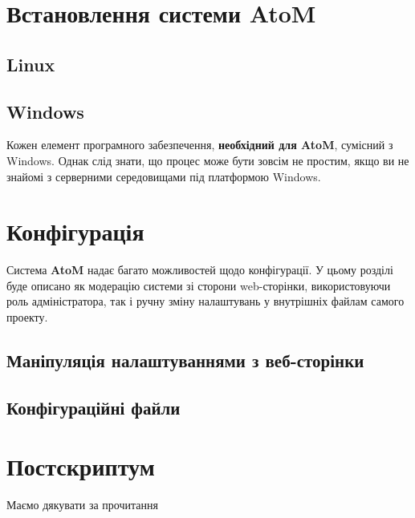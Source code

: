 \documentclass[14pt,a4paper]{article}
\begin{document}
\section{Встановлення системи AtoM}
\begin{large}

\subsection{Linux}



\subsection{Windows}
Кожен елемент програмного забезпечення, \textbf{необхідний для AtoM}, сумісний з Windows. Однак слід знати, що процес може бути зовсім не простим, якщо ви не знайомі з серверними середовищами під платформою Windows.
\end{large}


\section{Конфігурація}
\begin{large}
Система \textbf{AtoM} надає багато можливостей щодо конфігурації. У цьому розділі буде описано як модерацію системи зі сторони web-сторінки, використовуючи роль адміністратора, так і ручну зміну налаштувань у внутрішніх файлам самого проекту.

\subsection{Маніпуляція налаштуваннями з веб-сторінки}

\subsection{Конфігураційні файли}

\end{large}

\section{Постскриптум}
Маємо дякувати за прочитання
\end{document}
